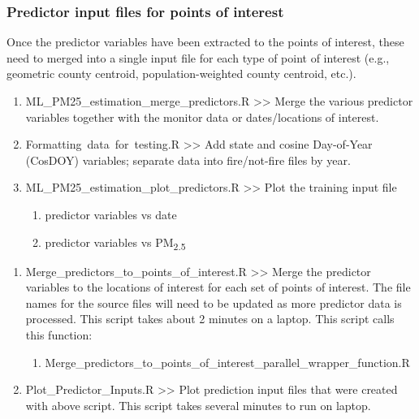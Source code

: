 \subsubsection{Predictor input files for points of interest}

Once the predictor variables have been extracted to the points of interest, these need to merged into a single input file for each type of point of interest (e.g., geometric county centroid, population-weighted county centroid, etc.).

\begin{enumerate}

\item ML\_PM25\_estimation\_merge\_predictors.R >>  Merge the various predictor variables together with the monitor data or dates/locations of interest. %

\item Formatting\ data\ for\ testing.R >> Add state and cosine Day-of-Year (CosDOY) variables; separate data into fire/not-fire files by year.


\item ML\_PM25\_estimation\_plot\_predictors.R >> Plot the training input file %
	\begin{enumerate}
		\item predictor variables vs date
		\item predictor variables vs PM\textsubscript{2.5}
	\end{enumerate}

\end{enumerate}


\begin{enumerate}
\item Merge\_predictors\_to\_points\_of\_interest.R >> Merge the predictor variables to the locations of interest for each set of points of interest. The file names for the source files will need to be updated as more predictor data is processed. This script takes about 2 minutes on a laptop. This script calls this function:

	\begin{enumerate}
	\item Merge\_predictors\_to\_points\_of\_interest\_parallel\_wrapper\_function.R
	\end{enumerate}

\item Plot\_Predictor\_Inputs.R >> Plot prediction input files that were created with above script. This script takes several minutes to run on laptop. 

\end{enumerate}
